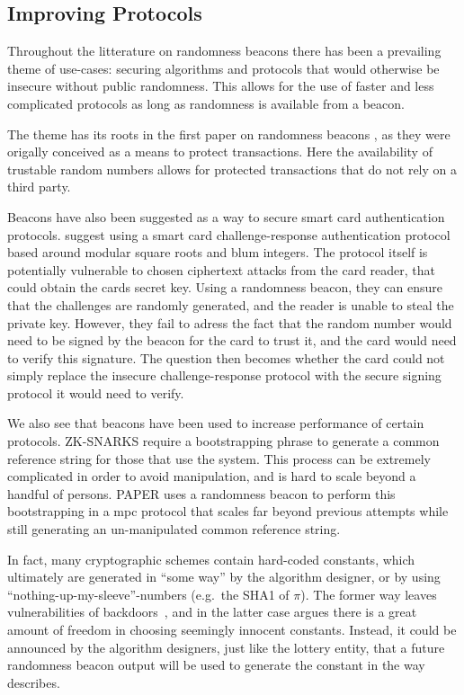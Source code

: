 \subsection{Improving Protocols}
Throughout the litterature on randomness beacons there has been a prevailing theme of use-cases: securing algorithms and protocols that would otherwise be insecure without public randomness. This allows for the use of faster and less complicated protocols as long as randomness is available from a beacon. 

The theme has its roots in the first paper on randomness beacons \cite{rabin1983transaction}, as they were origally conceived as a means to protect transactions. Here the availability of trustable random numbers allows for protected transactions that do not rely on a third party.  

Beacons have also been suggested as a way to secure smart card authentication protocols. \citet{fischer2011publicrandomnessservice} suggest using a smart card challenge-response authentication protocol based around modular square roots and blum integers. The protocol itself is potentially vulnerable to chosen ciphertext attacks from the card reader, that could obtain the cards secret key. Using a randomness beacon, they can ensure that the challenges are randomly generated, and the reader is unable to steal the private key. However, they fail to adress the fact that the random number would need to be signed by the beacon for the card to trust it, and the card would need to verify this signature. The question then becomes whether the card could not simply replace the insecure challenge-response protocol with the secure signing protocol it would need to verify.

We also see that beacons have been used to increase performance of certain protocols. ZK-SNARKS require a bootstrapping phrase to generate a common reference string for those that use the system. This process can be extremely complicated in order to avoid manipulation, and is hard to scale beyond a handful of persons. PAPER uses a randomness beacon to perform this bootstrapping in a mpc protocol that scales far beyond previous attempts while still generating an un-manipulated common reference string. 

In fact, many cryptographic schemes contain hard-coded constants, which ultimately are generated in \enquote{some way} by the algorithm designer, or by using \enquote{nothing-up-my-sleeve}-numbers (e.g.\ the SHA1 of $\pi$).
The former way leaves vulnerabilities of backdoors~, and in the latter case  argues there is a great amount of freedom in choosing seemingly innocent constants.
Instead, it could be announced by the algorithm designers, just like the lottery entity, that a future randomness beacon output will be used to generate the constant in the way  describes.